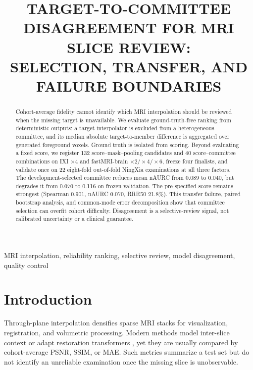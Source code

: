 \documentclass{article}
\title{TARGET-TO-COMMITTEE DISAGREEMENT FOR MRI SLICE REVIEW:\\
SELECTION, TRANSFER, AND FAILURE BOUNDARIES}
\begin{document}
\ninept
\maketitle

\begin{abstract}
Cohort-average fidelity cannot identify which MRI interpolation should be reviewed when the missing target is unavailable. We evaluate ground-truth-free ranking from deterministic outputs: a target interpolator is excluded from a heterogeneous committee, and its median absolute target-to-member difference is aggregated over generated foreground voxels. Ground truth is isolated from scoring. Beyond evaluating a fixed score, we register 132 score--mask--pooling candidates and 40 score--committee combinations on IXI $\times4$ and fastMRI-brain $\times2/\times4/\times6$, freeze four finalists, and validate once on 22 eight-fold out-of-fold NingXia examinations at all three factors. The development-selected committee reduces mean nAURC from 0.089 to 0.040, but degrades it from 0.070 to 0.116 on frozen validation. The pre-specified score remains strongest (Spearman 0.901, nAURC 0.070, RRR50 21.8\%). This transfer failure, paired bootstrap analysis, and common-mode error decomposition show that committee selection can overfit cohort difficulty. Disagreement is a selective-review signal, not calibrated uncertainty or a clinical guarantee.
\end{abstract}

\begin{keywords}
MRI interpolation, reliability ranking, selective review, model disagreement, quality control
\end{keywords}

\section{Introduction}
Through-plane interpolation densifies sparse MRI stacks for visualization, registration, and volumetric processing. Modern methods model inter-slice context or adapt restoration transformers \cite{song2024i3net,liang2021swinir,chen2022hat}, yet they are usually compared by cohort-average PSNR, SSIM, or MAE. Such metrics summarize a test set but do not identify an unreliable examination once the missing slice is unobservable.
\end{document}

